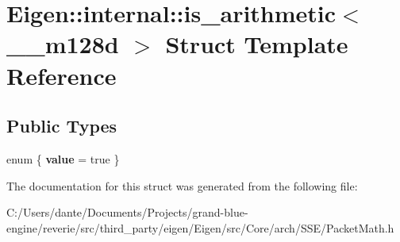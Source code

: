 \hypertarget{struct_eigen_1_1internal_1_1is__arithmetic_3_01____m128d_01_4}{}\section{Eigen\+::internal\+::is\+\_\+arithmetic$<$ \+\_\+\+\_\+m128d $>$ Struct Template Reference}
\label{struct_eigen_1_1internal_1_1is__arithmetic_3_01____m128d_01_4}
\subsection*{Public Types}
\begin{DoxyCompactItemize}
\item 
\mbox{\label{struct_eigen_1_1internal_1_1is__arithmetic_3_01____m128d_01_4_a64616b124eb415063a7e2eab2fc238bd}} 
enum \{ {\bfseries value} = true
 \}
\end{DoxyCompactItemize}


The documentation for this struct was generated from the following file\+:\begin{DoxyCompactItemize}
\item 
C\+:/\+Users/dante/\+Documents/\+Projects/grand-\/blue-\/engine/reverie/src/third\+\_\+party/eigen/\+Eigen/src/\+Core/arch/\+S\+S\+E/Packet\+Math.\+h\end{DoxyCompactItemize}
